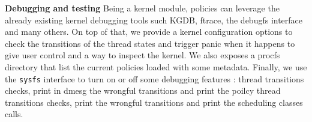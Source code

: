 \textbf{Debugging and testing} Being a kernel module, policies can leverage the already existing kernel debugging tools such KGDB\cite{kgdb}, ftrace, the debugfs interface and many others. On top of that, we provide a kernel configuration options to check the transitions of the thread states and trigger panic when it happens to give user control and a way to inspect the kernel. We also exposes a procfs directory that list the current policies loaded with some metadata. Finally, we use the \texttt{sysfs} interface to turn on or off some debugging features : thread transitions checks, print in dmesg the wrongful transitions and print the poilcy thread transitions checks, print the wrongful transitions and print the scheduling classes calls. 


